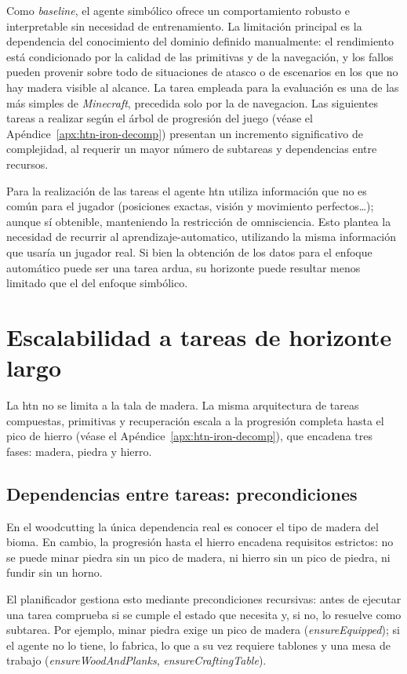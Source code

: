 Como \textit{baseline}, el agente simbólico ofrece un comportamiento robusto e
interpretable sin necesidad de entrenamiento. La limitación principal
es la dependencia del conocimiento del dominio definido
manualmente: el rendimiento está condicionado por la calidad de las primitivas y
de la navegación, y los fallos pueden provenir sobre todo de situaciones de atasco o de
escenarios en los que no hay madera visible al alcance. 
La tarea empleada para la evaluación es una de las más simples de \textit{Minecraft}, precedida solo
por la de \gls{navegacion}. Las siguientes tareas a realizar según el
árbol de progresión del juego (véase el Apéndice~\ref{apx:htn-iron-decomp})
presentan un incremento significativo de complejidad, al requerir un mayor número de subtareas
y dependencias entre recursos.

Para la realización de las tareas el agente \gls{htn} utiliza información que no es común para el 
jugador (posiciones exactas, visión y movimiento perfectos\dots); aunque sí obtenible, manteniendo la
restricción de omnisciencia. Esto plantea la necesidad de recurrir al \gls{aprendizaje-automatico}, 
utilizando la misma información que usaría un jugador real. 
Si bien la obtención de los datos para el enfoque automático puede ser una tarea ardua, 
su horizonte puede resultar menos limitado que el del enfoque simbólico.

\section{Escalabilidad a tareas de horizonte largo}
La \gls{htn} no se limita a la tala de madera. La misma arquitectura de tareas
compuestas, primitivas y recuperación escala a la progresión completa hasta el pico
de hierro (véase el Apéndice~\ref{apx:htn-iron-decomp}), que encadena
tres fases: madera, piedra y hierro. 

\subsection{Dependencias entre tareas: precondiciones}
En el \gls{woodcutting} la única dependencia real es conocer el tipo de madera del
\gls{bioma}. En cambio, la progresión hasta el hierro encadena requisitos estrictos:
no se puede minar piedra sin un pico de madera, ni hierro sin un pico de piedra,
ni fundir sin un horno.

El planificador gestiona esto mediante precondiciones recursivas: antes de ejecutar
una tarea comprueba si se cumple el estado que necesita y, si no, lo resuelve como
subtarea. Por ejemplo, minar piedra exige un pico de madera
(\textit{ensureEquipped}); si el agente no lo tiene, lo fabrica, lo que a su vez
requiere tablones y una mesa de trabajo (\textit{ensureWoodAndPlanks},
\textit{ensureCraftingTable}).

